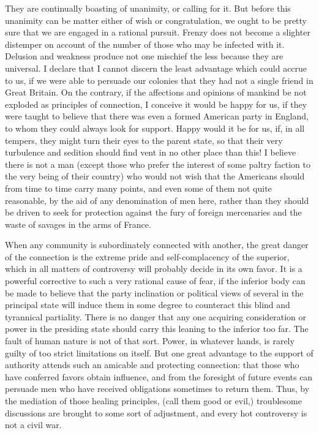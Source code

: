They are continually boasting of unanimity, or calling for it. But before this unanimity can be matter either of wish or congratulation, we ought to be pretty sure that we are engaged in a rational pursuit. Frenzy does not become a slighter distemper on account of the number of those who may be infected with it. Delusion and weakness produce not one mischief the less because they are universal. I declare that I cannot discern the least advantage which could accrue to us, if we were able to persuade our colonies that they had not a single friend in Great Britain. On the contrary, if the affections and opinions of mankind be not exploded as principles of connection, I conceive it would be happy for us, if they were taught to believe that there was even a formed American party in England, to whom they could always look for support. Happy would it be for us, if, in all tempers, they might turn their eyes to the parent state, so that their very turbulence and sedition should find vent in no other place than this! I believe there is not a man (except those who prefer the interest of some paltry faction to the very being of their country) who would not wish that the Americans should from time to time carry many points, and even some of them not quite reasonable, by the aid of any denomination of men here, rather than they should be driven to seek for protection against the fury of foreign mercenaries and the waste of savages in the arms of France.

When any community is subordinately connected with another, the great danger of the connection is the extreme pride and self-complacency of the superior, which in all matters of controversy will probably decide in its own favor. It is a powerful corrective to such a very rational cause of fear, if the inferior body can be made to believe that the party inclination or political views of several in the principal state will induce them in some degree to counteract this blind and tyrannical partiality. There is no danger that any one acquiring consideration or power in the presiding state should carry this leaning to the inferior too far. The fault of human nature is not of that sort. Power, in whatever hands, is rarely guilty of too strict limitations on itself. But one great advantage to the support of authority attends such an amicable and protecting connection: that those who have conferred favors obtain influence, and from the foresight of future events can persuade men who have received obligations sometimes to return them. Thus, by the mediation of those healing principles, (call them good or evil,) troublesome discussions are brought to some sort of adjustment, and every hot controversy is not a civil war.

